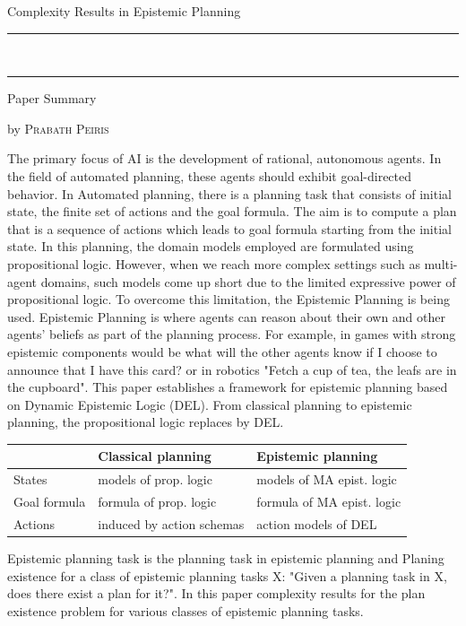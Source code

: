 \documentclass[10pt,legal]{article} %
\newcommand{\HorRule}[1]{\noindent\rule{\linewidth}{#1}} %
\newcommand{\NewsletterName}[1]{ %
\begin{center}
\huge \usefont{T1}{fvs}{b}{n} %
#1
\end{center}	
\par \normalsize \normalfont}
\newcommand{\NewsItem}[1]{ %
\usefont{T1}{fvs}{n}{n} %
\vspace{24pt}\large #1\vspace{3pt} %
\par \normalsize \normalfont}
\newcommand{\NewsAuthor}[1]{ %
\hfill by \textsc{#1} \vspace{10pt} %
\par \normalfont}
\begin{document}
\NewsletterName{Complexity Results in Epistemic Planning} %

\noindent\HorRule{2pt} \\[-0.75\baselineskip] %
\HorRule{0.5pt} %

\begin{multicols}{2} %

\NewsItem{Paper Summary  \cite{2014arXiv1404.0844A} }
\NewsAuthor{Prabath Peiris}

The primary focus of AI is the development of rational, autonomous agents. In the field of automated planning, these agents should exhibit goal-directed behavior. In Automated planning, there is a planning task that consists of initial state, the finite set of actions and the goal formula. The aim is to compute a plan that is a sequence of actions which leads to goal formula starting from the initial state. In this planning, the domain models employed are formulated using propositional logic. However, when we reach more complex settings such as multi-agent domains, such models come up short due to the limited expressive power of propositional logic. To overcome this limitation, the Epistemic Planning is being used. Epistemic Planning is where agents can reason about their own and other agents' beliefs as part of the planning process. For example, in games with strong epistemic components would be what will the other agents know if I choose to announce that I have this card? or in robotics "Fetch a cup of tea, the leafs are in the cupboard". 
This paper \cite{2014arXiv1404.0844A}  establishes a framework for epistemic planning based on Dynamic Epistemic Logic (DEL). From classical planning to epistemic planning, the propositional logic replaces by DEL. 
\begin{center}
\small
\begin{tabular}{ |p{1cm}|p{3.1cm}|p{3.2cm} |} 
 \hline
  & Classical planning & Epistemic planning \\ \hline
 States & models of prop. logic &  models of MA epist. logic \\\hline
Goal formula & formula of prop. logic & formula of MA epist. logic \\ \hline
Actions & induced by action schemas &  action models of DEL \\
 \hline
\end{tabular}
\end{center}
Epistemic planning task is the planning task in epistemic planning and Planing existence for a class of epistemic planning tasks X: "Given a planning task in X, does there exist a plan for it?". In this paper complexity results for the plan existence problem for various classes of epistemic planning tasks.


\end{multicols}
\end{document}
